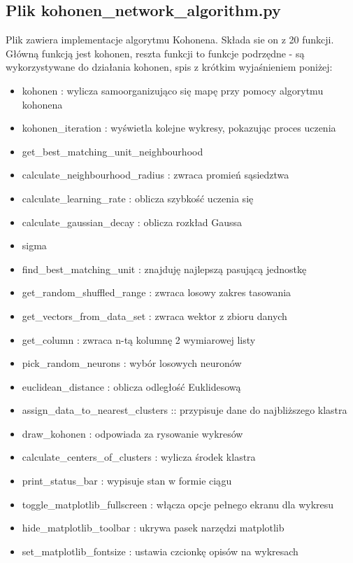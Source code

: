 \documentclass{classrep}
\begin{document}
{\subsection{Plik kohonen\_network\_algorithm.py}
{
Plik zawiera implementacje algorytmu Kohonena. Składa sie on z 20 funkcji. Główną funkcją jest kohonen, reszta
funkcji to funkcje podrzędne - są wykorzystywane do działania kohonen, spis z krótkim wyjaśnieniem poniżej:
\begin{itemize}
\item kohonen : wylicza samoorganizująco się mapę przy pomocy algorytmu kohonena
\item kohonen\_iteration : wyświetla kolejne wykresy, pokazując proces uczenia
\item get\_best\_matching\_unit\_neighbourhood
\item calculate\_neighbourhood\_radius : zwraca promień sąsiedztwa
\item calculate\_learning\_rate : oblicza szybkość uczenia się
\item calculate\_gaussian\_decay : oblicza rozkład Gaussa
\item sigma
\item find\_best\_matching\_unit : znajduję najlepszą pasującą jednostkę
\item get\_random\_shuffled\_range : zwraca losowy zakres tasowania
\item get\_vectors\_from\_data\_set : zwraca wektor z zbioru danych
\item get\_column : zwraca n-tą kolumnę 2 wymiarowej listy
\item pick\_random\_neurons : wybór losowych neuronów
\item euclidean\_distance : oblicza odległość Euklidesową
\item assign\_data\_to\_nearest\_clusters :: przypisuje dane do najbliższego klastra
\item draw\_kohonen : odpowiada za rysowanie wykresów
\item calculate\_centers\_of\_clusters : wylicza środek klastra
\item print\_status\_bar : wypisuje stan w formie ciągu
\item toggle\_matplotlib\_fullscreen : włącza opcje pełnego ekranu dla wykresu
\item hide\_matplotlib\_toolbar : ukrywa pasek narzędzi matplotlib
\item set\_matplotlib\_fontsize : ustawia czcionkę opisów na wykresach
\end{itemize}
}

}
\end{document}
